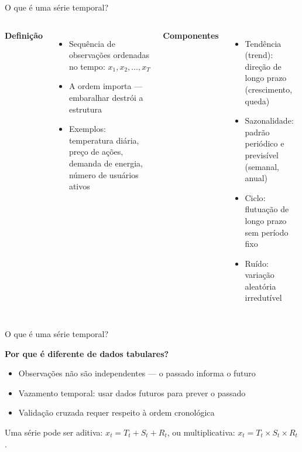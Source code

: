 \documentclass[xcolor=dvipsnames,t,aspectratio=169]{beamer}
\newcommand{\highlight}[1]{{\color{nes_dark_orange} #1}}
\begin{document}
\begin{frame}[c]{O que é uma série temporal?}

\begin{columns}
\textbf{\color{nes_dark_purple}Definição}
\begin{itemize}
    \item Sequência de observações \highlight{ordenadas no tempo}: $x_1, x_2, \ldots, x_T$
    \item A ordem importa — embaralhar destrói a estrutura
    \item Exemplos: temperatura diária, preço de ações, demanda de energia, número de usuários ativos
\end{itemize}


\textbf{\color{nes_dark_purple}Componentes}
\begin{itemize}
    \item \highlight{Tendência (trend)}: direção de longo prazo (crescimento, queda)
    \item \highlight{Sazonalidade}: padrão periódico e previsível (semanal, anual)
    \item \highlight{Ciclo}: flutuação de longo prazo sem período fixo
    \item \highlight{Ruído}: variação aleatória irredutível
\end{itemize}


\end{columns}

\end{frame}

\begin{frame}[c]{O que é uma série temporal?}


\textbf{\color{nes_dark_purple}Por que é diferente de dados tabulares?}
\begin{itemize}
    \item Observações \highlight{não são independentes} — o passado informa o futuro
    \item Vazamento temporal: usar dados futuros para prever o passado
    \item Validação cruzada requer \highlight{respeito à ordem cronológica}
\end{itemize}


\begin{display}[Decomposição]
Uma série pode ser aditiva: $x_t = T_t + S_t + R_t$, ou multiplicativa: $x_t = T_t \times S_t \times R_t$.
\end{display}


\end{frame}
\end{document}
